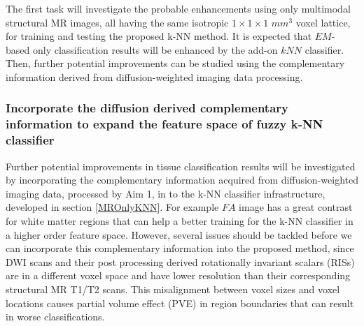 \noindent The first task will investigate the probable enhancements using only multimodal structural MR images, all having the same isotropic $1\times1\times1$ $mm^3$ voxel lattice, for training and testing the proposed k-NN method. It is expected that $EM$-based only classification results will be enhanced by the add-on $kNN$ classifier. Then, further potential improvements can be studied using the complementary information derived from diffusion-weighted imaging data processing.

\subsubsection{Incorporate the diffusion derived complementary information to expand the feature space of fuzzy k-NN classifier}
Further potential improvements in tissue classification results will be investigated by incorporating the complementary information acquired from diffusion-weighted imaging data, processed by Aim 1, in to the k-NN classifier infrastructure, developed in section \ref{MROnlyKNN}. For example $FA$ image has a great contrast for white matter regions that can help a better training for the k-NN classifier in a higher order feature space. However, several issues should be tackled before we can incorporate this complementary information into the proposed method, since DWI scans and their post processing derived rotationally invariant scalars (RISs) are in a different voxel space and have lower resolution than their corresponding structural MR T1/T2 scans. This misalignment between voxel sizes and voxel locations causes partial volume effect (PVE) in region boundaries that can result in worse classifications.
\newline

